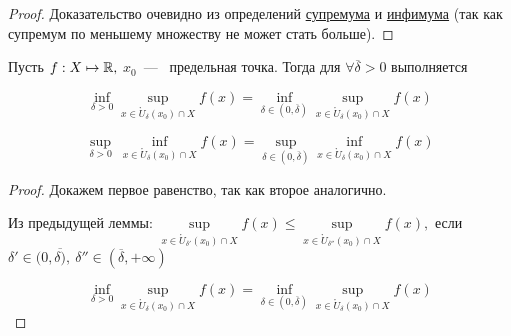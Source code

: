 \begin{proof}
    Доказательство очевидно из определений \hyperlink{def1.23}{супремума} и \hyperlink{def1.25}{инфимума} (так как супремум по меньшему множеству не может стать больше).
\end{proof}

\begin{lemma}
    \hypertarget{lemm4.6}{} Пусть $f: X \mapsto \mathbb{R}, $ $x_{0}$~---~ предельная точка. Тогда для $ \forall \overline{\delta} > 0 $ выполняется
    
    $$\underset{\delta > 0}{\inf} \underset{x\in \mathring{U}_{\delta} (x_{0}) \cap X}{\sup} f (x) = \underset{\delta \in (0, \overline{\delta}) }{\inf} \underset{x\in \mathring{U}_{\delta} (x_{0}) \cap X}{\sup} f (x)$$

    $$\underset{\delta > 0}{\sup}\  \underset{x\in \mathring{U}_{\delta} (x_{0}) \cap X}{\inf} f (x) = \underset{\delta \in (0, \overline{\delta}) }{\sup} \underset{x\in \mathring{U}_{\delta} (x_{0}) \cap X}{\inf} f (x)$$
\end{lemma}

\begin{proof}
    Докажем первое равенство, так как второе аналогично.
\begin{center}
    Из предыдущей леммы: $ \underset{x\in \mathring{U}_{\delta'} (x_{0}) \cap X}{\sup} f (x) \leq  \underset{x\in \mathring{U}_{\delta''} (x_{0}) \cap X}{\sup} f (x),$ если $\delta' \in (0, \overline{\delta)},\  \delta'' \in (\overline{\delta}, +\infty)$
\end{center}
    $$\underset{\delta > 0}{\inf} \underset{x\in \mathring{U}_{\delta} (x_{0}) \cap X}{\sup} f (x) = \underset{\delta \in (0, \overline{\delta}) }{\inf} \underset{x\in \mathring{U}_{\delta} (x_{0}) \cap X}{\sup} f (x)$$
\end{proof}

